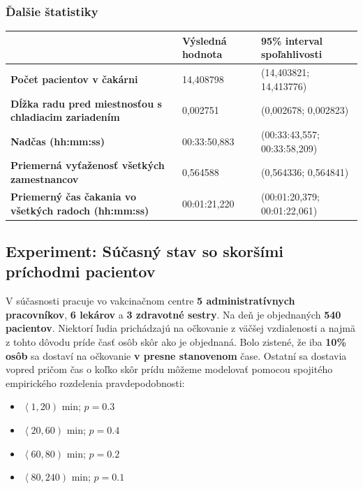 \documentclass[letterpaper]{article}
\begin{document}
	\newpage

	\subsubsection*{Ďalšie štatistiky}
	
	\begin{table}[hbt!]
		\begin{tabular}{p{6cm}|p{4.5cm}p{4.5cm}}
			& \textbf{Výsledná hodnota} & \textbf{95\% interval spoľahlivosti} \\
			\hline\hline
			\textbf{Počet pacientov v čakárni} 								& 14,408798           & (14,403821; 14,413776)			
			\\\hline
			\textbf{Dĺžka radu pred miestnosťou s chladiacim zariadením}	& 0,002751            & (0,002678; 0,002823)	
			\\\hline
			\textbf{Nadčas (hh:mm:ss)}										& 00:33:50,883        & (00:33:43,557; 00:33:58,209)
			\\\hline
			\textbf{Priemerná vyťaženosť všetkých zamestnancov}  			& 0,564588            & (0,564336; 0,564841)
			\\\hline
			\textbf{Priemerný čas čakania vo všetkých radoch (hh:mm:ss)}	& 00:01:21,220        & (00:01:20,379; 00:01:22,061)
		\end{tabular}
	\end{table}

	\subsection{Experiment: Súčasný stav so skoršími príchodmi pacientov}
	
	V súčasnosti pracuje vo vakcinačnom centre \textbf{5 administratívnych pracovníkov}, \textbf{6 lekárov} a \textbf{3 zdravotné sestry}. Na deň je objednaných \textbf{540 pacientov}. Niektorí ľudia prichádzajú na očkovanie z väčšej vzdialenosti a najmä z tohto dôvodu príde časť osôb skôr ako je objednaná. Bolo zistené, že iba \textbf{10\% osôb} sa dostaví na očkovanie \textbf{v presne stanovenom} čase. Ostatní sa dostavia vopred pričom čas o koľko skôr prídu môžeme modelovať pomocou spojitého empirického rozdelenia pravdepodobnosti: 
	\begin{itemize}
		\item $ \left\langle 1, 20 \right) $ min; $ p = 0.3 $
		\item $ \left\langle 20, 60 \right) $ min; $ p = 0.4 $
		\item $ \left\langle 60, 80 \right) $ min; $ p = 0.2 $
		\item $ \left\langle 80, 240 \right) $ min; $ p = 0.1 $
	\end{itemize}
	
\end{document}
